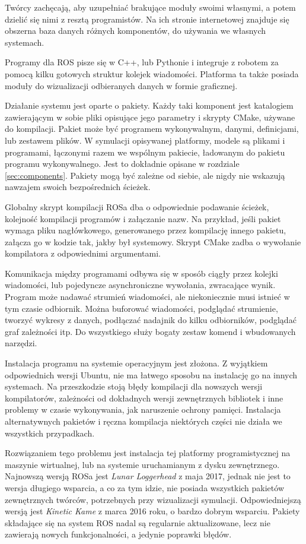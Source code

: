 	Twórcy zachęcają, aby uzupełniać brakujące moduły swoimi własnymi, a potem dzielić się nimi z resztą programistów.
	Na ich stronie internetowej znajduje się obszerna baza danych różnych komponentów, do używania we własnych systemach.

	Programy dla ROS pisze się w C++, lub Pythonie i integruje z robotem za pomocą kilku gotowych struktur kolejek wiadomości.
	Platforma ta także posiada moduły do wizualizacji odbieranych danych w formie graficznej.

	Działanie systemu jest oparte o pakiety.
	Każdy taki komponent jest katalogiem zawierającym w sobie pliki opisujące jego parametry i skrypty CMake, używane do kompilacji.
	Pakiet może być programem wykonywalnym, danymi, definicjami, lub zestawem plików.
	W symulacji opisywanej platformy, modele są plikami i programami, łączonymi razem we wspólnym pakiecie, ładowanym do pakietu programu wykonywalnego.
	Jest to dokładnie opisane w rozdziale \ref{sec:components}.
	Pakiety mogą być zależne od siebie, ale nigdy nie wskazują nawzajem swoich bezpośrednich ścieżek.

	Globalny skrypt kompilacji ROSa dba o odpowiednie podawanie ścieżek, kolejność kompilacji programów i załączanie nazw.
	Na przykład, jeśli pakiet wymaga pliku nagłówkowego, generowanego przez kompilację innego pakietu, załącza go w kodzie tak, jakby był systemowy.
	Skrypt CMake zadba o wywołanie kompilatora z odpowiednimi argumentami.

	Komunikacja między programami odbywa się w sposób ciągły przez kolejki wiadomości, lub pojedyncze asynchroniczne wywołania, zwracające wynik.
	Program może nadawać strumień wiadomości, ale niekoniecznie musi istnieć w tym czasie odbiornik.
	Można buforować wiadomości, podglądać strumienie, tworzyć wykresy z danych, podłączać nadajnik do kilku odbiorników, podglądać graf zależności itp.
	Do wszystkiego służy bogaty zestaw komend i wbudowanych narzędzi.

	Instalacja programu na systemie operacyjnym jest złożona.
	Z wyjątkiem odpowiednich wersji Ubuntu, nie ma łatwego sposobu na instalację go na innych systemach.
	Na przeszkodzie stoją błędy kompilacji dla nowszych wersji kompilatorów, zależności od dokładnych wersji zewnętrznych bibliotek i 
	inne problemy w czasie wykonywania, jak naruszenie ochrony pamięci. 
	Instalacja alternatywnych pakietów i ręczna kompilacja niektórych części nie działa we wszystkich przypadkach.

	Rozwiązaniem tego problemu jest instalacja tej platformy programistycznej na maszynie wirtualnej, lub na systemie uruchamianym z dysku zewnętrznego. 
	Najnowszą wersją ROSa jest \emph{Lunar Loggerhead} z maja 2017, jednak nie jest to wersja długiego wsparcia, a co za tym idzie, nie posiada wszystkich
	pakietów zewnętrznych twórców, potrzebnych przy wizualizacji symulacji.
	Odpowiedniejszą wersją jest \emph{Kinetic Kame} z marca 2016 roku, o bardzo dobrym wsparciu.
	Pakiety składające się na system ROS nadal są regularnie aktualizowane, lecz nie zawierają nowych funkcjonalności, a jedynie poprawki błędów.


